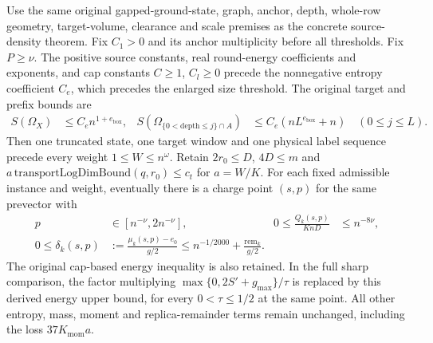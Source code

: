 \begin{lemma}
    \label{thm:arealaw-source-selected-sharp-energy}
    \leanok
    Use the same original gapped-ground-state, graph, anchor, depth,
    whole-row geometry, target-volume, clearance and scale premises
    as the concrete source-density theorem.  Fix $C_1>0$ and its anchor
    multiplicity before all thresholds.  Fix $P\geq\nu$.
    The positive source constants, real round-energy coefficients and
    exponents, and cap constants $C\geq1$, $C_l\geq0$ precede the
    nonnegative entropy coefficient $C_e$, which precedes the enlarged
    size threshold.  The original target and prefix bounds are
    \begin{align}
        S(\Omega_X) & \leq C_en^{1+e_{\mathrm{box}}},                        &
        S(\Omega_{\{0<\mathrm{depth}\leq j\}\cap A})
                    & \leq C_e(nL^{e_{\mathrm{box}}}+n)\quad(0\leq j\leq L).
    \end{align}
    Then one truncated state, one target window and one physical label
    sequence precede every weight $1\leq W\leq n^\omega$.
    Retain $2r_0\leq D$, $4D\leq m$ and
    $a\,\mathrm{transportLogDimBound}(q,r_0)\leq c_t$ for $a=W/K$.
    For each fixed admissible instance and weight, eventually there is a
    charge point $(s,p)$ for the same prevector with
    \begin{align}
        p                         & \in[n^{-\nu},2n^{-\nu}],     &
        0\leq\frac{Q_k(s,p)}{KnD} & \leq n^{-8\nu},\nonumber       \\
        0\leq\delta_k(s,p)
                                  & :=\frac{\mu_k(s,p)-e_0}{g/2}
        \leq n^{-1/2000}+\frac{\mathrm{rem}_k}{g/2}.
        \label{eq:arealaw-source-selected-energy-power}
    \end{align}
    The original cap-based energy inequality is also retained.
    In the full sharp comparison, the factor multiplying
    $\max\{0,2S'+g_{\max}\}/\tau$ is replaced by this derived energy
    upper bound, for every $0<\tau\leq1/2$ at the same point.
    All other entropy, mass, moment and replica-remainder terms remain
    unchanged, including the loss $37K_{\mathrm{mom}}a$.
\end{lemma}
